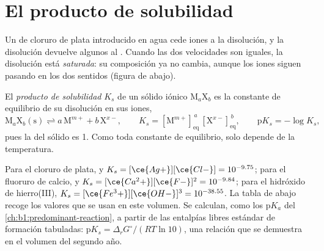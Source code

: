 \section{El producto de solubilidad}\label{sec:b1:precipitation:product}

Un  de cloruro de plata introducido en agua cede iones a la
disolución, y la disolución devuelve algunos al . Cuando las dos
velocidades son iguales, la disolución está \emph{saturada}: su
composición ya no cambia, aunque los iones siguen pasando en los dos
sentidos (figura de abajo).

\begin{definition}\label{def:b1:precipitation:solubility-product}
El \emph{producto de solubilidad} $K_s$ de
un sólido iónico $\mathrm{M}_a\mathrm{X}_b$ es la constante de equilibrio
de su disolución en sus iones,
\[
  \mathrm{M}_a\mathrm{X}_b\mathrm{(s)} \rightleftharpoons a\,\mathrm{M}^{m+}
  + b\,\mathrm{X}^{x-}, \qquad
  K_s = [\mathrm{M}^{m+}]_{\mathrm{eq}}^{\,a}\,[\mathrm{X}^{x-}]_{\mathrm{eq}}^{\,b},
  \qquad \mathrm{p}K_s = -\log K_s ,
\]
pues la  del sólido es 1. Como toda constante de equilibrio,
solo depende de la temperatura.
\end{definition}

Para el cloruro de plata,  y $K_s =
[\ce{Ag+}][\ce{Cl-}] = 10^{-9.75}$; para el fluoruro de calcio,
 y $K_s = [\ce{Ca^2+}][\ce{F-}]^2 = 10^{-9.84}$; para el
hidróxido de hierro(III), $K_s = [\ce{Fe^3+}][\ce{OH-}]^3 = 10^{-38.55}$.
La tabla de abajo recoge los valores que se usan en este volumen. Se
calculan, como los $\mathrm{p}K_a$ del
\cref{ch:b1:predominant-reaction}, a partir de las entalpías libres
estándar de formación tabuladas: $\mathrm{p}K_s = \Delta_r G^\circ/(RT\ln 10)$,
una relación que se demuestra en el volumen del segundo año.

